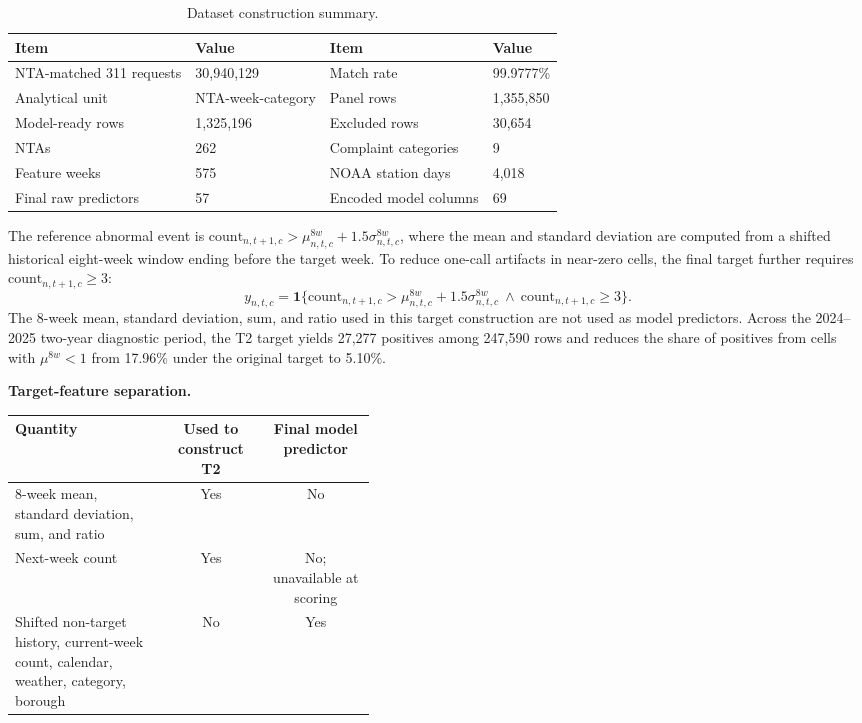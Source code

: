 \documentclass[pdflatex,sn-mathphys-num]{sn-jnl}
\begin{document}
\begin{table}[!htbp]
\caption{Dataset construction summary.}\label{tab:data_summary}
\centering
\begin{tabular}{@{}llll@{}}
\toprule
Item & Value & Item & Value \\
\midrule
NTA-matched 311 requests & 30,940,129 & Match rate & 99.9777\% \\
Analytical unit & NTA-week-category & Panel rows & 1,355,850 \\
Model-ready rows & 1,325,196 & Excluded rows & 30,654 \\
NTAs & 262 & Complaint categories & 9 \\
Feature weeks & 575 & NOAA station days & 4,018 \\
Final raw predictors & 57 & Encoded model columns & 69 \\
\bottomrule
\end{tabular}
\end{table}

The reference abnormal event is \(\text{count}_{n,t+1,c}>\mu^{8w}_{n,t,c}+1.5\sigma^{8w}_{n,t,c}\), where the mean and standard deviation are computed from a shifted historical eight-week window ending before the target week. To reduce one-call artifacts in near-zero cells, the final target further requires \(\text{count}_{n,t+1,c}\geq3\):
\[
y_{n,t,c}=\mathbf{1}\{\text{count}_{n,t+1,c}>\mu^{8w}_{n,t,c}+1.5\sigma^{8w}_{n,t,c}\ \wedge\ \text{count}_{n,t+1,c}\ge3\}.
\]
The 8-week mean, standard deviation, sum, and ratio used in this target construction are not used as model predictors. Across the 2024--2025 two-year diagnostic period, the T2 target yields 27,277 positives among 247,590 rows and reduces the share of positives from cells with \(\mu^{8w}<1\) from 17.96\% under the original target to 5.10\%.

\begin{center}
\small
\textbf{Target-feature separation.}\quad
\begin{tabular}{@{}p{0.42\linewidth}cc@{}}
\toprule
Quantity & Used to construct T2 & Final model predictor \\
\midrule
8-week mean, standard deviation, sum, and ratio & Yes & No \\
Next-week count & Yes & No; unavailable at scoring \\
Shifted non-target history, current-week count, calendar, weather, category, borough & No & Yes \\
\bottomrule
\end{tabular}
\end{center}
\end{document}
